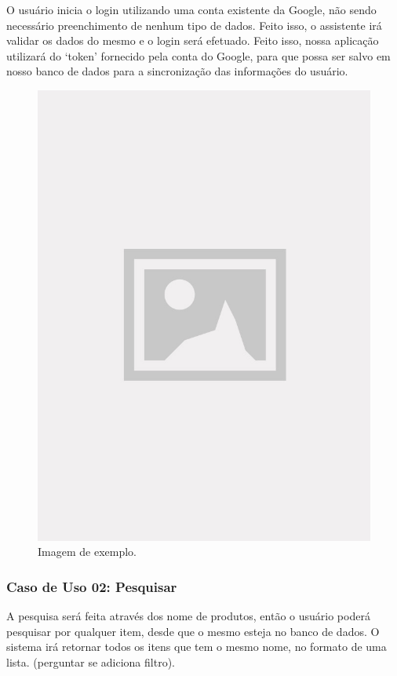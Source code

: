 O usuário inicia o login utilizando uma conta existente da Google, não sendo necessário preenchimento de nenhum tipo de dados. Feito isso, o assistente irá validar os dados do mesmo e o login será efetuado. Feito isso, nossa aplicação utilizará do ‘token’ fornecido pela conta do Google, para que possa ser salvo em nosso banco de dados para a sincronização das informações do usuário.

\begin{figure}[!htb]
\centering
\caption{Imagem de exemplo.}
\includegraphics[width=\linewidth]{figuras/placeholder.jpg}
\end{figure}

\subsubsection{Caso de Uso 02: Pesquisar}

A pesquisa será feita através dos nome de produtos, então o usuário poderá pesquisar por qualquer item, desde que o mesmo esteja no banco de dados. O sistema irá retornar todos os itens que tem o mesmo nome, no formato de uma lista. (perguntar se adiciona filtro).

